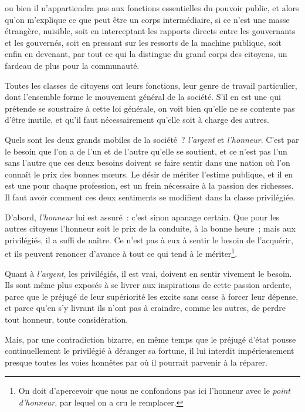 \documentclass[french,twoside]{book} %
\begin{document}
ou bien il n’appartiendra pas aux fonctions essentielles du pouvoir public, et alors qu’on m’explique ce que peut être un corps intermédiaire, si ce n’est une masse étrangère, nuisible, soit en interceptant les rapports directs entre les gouvernants et les gouvernés, soit en pressant sur les ressorts de la machine publique, soit enfin en devenant, par tout ce qui la distingue du grand corps des citoyens, un fardeau de plus pour la communauté.\par
Toutes les classes de citoyens ont leurs fonctions, leur genre de travail particulier, dont l’ensemble forme le mouvement général de la société. S’il en est une qui prétende se soustraire à cette loi générale, on voit bien qu’elle ne se contente pas d’être inutile, et qu’il faut nécessairement qu’elle soit à charge des autres.\par
Quels sont les deux grands mobiles de la société ? {\itshape l’argent} et {\itshape l’honneur}. C’est par le besoin que l’on a de l’un et de l’autre qu’elle se soutient, et ce n’est pas l’un sans l’autre que ces deux besoins doivent se faire sentir dans une nation où l’on connaît le prix des bonnes mœurs. Le désir de mériter l’estime publique, et il en est une pour chaque profession, est un frein nécessaire à la passion des richesses. Il faut avoir comment ces deux sentiments se modifient dans la classe privilégiée.\par
D’abord, {\itshape l’honneur} lui est assuré : c’est sinon apanage certain. Que pour les autres citoyens l’honneur soit le prix de la conduite, à la bonne heure ; mais aux privilégiés, il a suffi de naître. Ce n’est pas à eux à sentir le besoin de l’acquérir, et ils peuvent renoncer d’avance à tout ce qui tend à le mériter\footnote{On doit d’apercevoir que nous ne confondons pas ici l’honneur avec le {\itshape point d’honneur}, par lequel on a cru le remplacer.}.\par
Quant à {\itshape l’argent}, les privilégiés, il est vrai, doivent en sentir vivement le besoin. Ils sont même plus exposés à se livrer aux inspirations de cette passion ardente, parce que le préjugé de leur supériorité les excite sans cesse à forcer leur dépense, et parce qu’en s’y livrant ils n’ont pas à craindre, comme les autres, de perdre tout honneur, toute considération.\par
Mais, par une contradiction bizarre, en même temps que le préjugé d’état pousse continuellement le privilégié à déranger sa fortune, il lui interdit impérieusement presque toutes les voies honnêtes par où il pourrait parvenir à la réparer.\par
\end{document}
